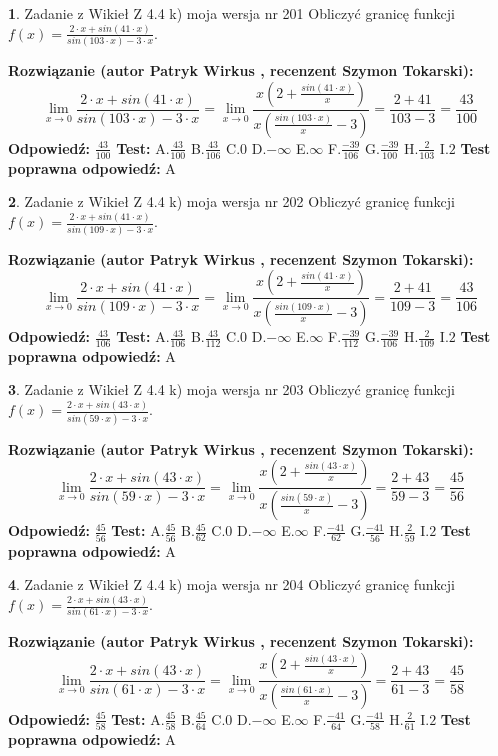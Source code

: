\documentclass[12pt, a4paper]{article}
\theoremstyle{definition} %
\newtheorem{zad}{}
\newcommand{\zadStart}[1]{\begin{zad}#1\newline}
\newcommand{\zadStop}{\end{zad}}
\newcommand{\rozwStart}[2]{\noindent \textbf{Rozwiązanie (autor #1 , recenzent #2): }\newline}
\newcommand{\rozwStop}{\newline}
\newcommand{\odpStart}{\noindent \textbf{Odpowiedź:}\newline}
\newcommand{\odpStop}{\newline}
\newcommand{\testStart}{\noindent \textbf{Test:}\newline}
\newcommand{\testStop}{\newline}
\newcommand{\kluczStart}{\noindent \textbf{Test poprawna odpowiedź:}\newline}
\newcommand{\kluczStop}{\newline}
\begin{document}
\zadStart{Zadanie z Wikieł Z 4.4 k) moja wersja nr 201}
Obliczyć granicę funkcji $f(x)=\frac{2\cdot x +sin(41\cdot x)}{sin(103\cdot x) -3\cdot x}$.
\zadStop
\rozwStart{Patryk Wirkus}{Szymon Tokarski}
$$\lim\limits_{x\to 0}\frac{2\cdot x +sin(41\cdot x)}{sin(103\cdot x) -3\cdot x}
=\lim\limits_{x\to 0}\frac{x(2+\frac{sin(41\cdot x)}{x})}{x(\frac{sin(103\cdot x)}{x}-3)}
=\frac{2+41}{103-3} = \frac{43}{100}$$
\rozwStop
\odpStart
$\frac{43}{100}$
\odpStop
\testStart
A.$\frac{43}{100}$
B.$\frac{43}{106}$
C.$0$
D.$-\infty$
E.$\infty$
F.$\frac{-39}{106}$
G.$\frac{-39}{100}$
H.$\frac{2}{103}$
I.$2$
\testStop
\kluczStart
A
\kluczStop



\zadStart{Zadanie z Wikieł Z 4.4 k) moja wersja nr 202}
Obliczyć granicę funkcji $f(x)=\frac{2\cdot x +sin(41\cdot x)}{sin(109\cdot x) -3\cdot x}$.
\zadStop
\rozwStart{Patryk Wirkus}{Szymon Tokarski}
$$\lim\limits_{x\to 0}\frac{2\cdot x +sin(41\cdot x)}{sin(109\cdot x) -3\cdot x}
=\lim\limits_{x\to 0}\frac{x(2+\frac{sin(41\cdot x)}{x})}{x(\frac{sin(109\cdot x)}{x}-3)}
=\frac{2+41}{109-3} = \frac{43}{106}$$
\rozwStop
\odpStart
$\frac{43}{106}$
\odpStop
\testStart
A.$\frac{43}{106}$
B.$\frac{43}{112}$
C.$0$
D.$-\infty$
E.$\infty$
F.$\frac{-39}{112}$
G.$\frac{-39}{106}$
H.$\frac{2}{109}$
I.$2$
\testStop
\kluczStart
A
\kluczStop



\zadStart{Zadanie z Wikieł Z 4.4 k) moja wersja nr 203}
Obliczyć granicę funkcji $f(x)=\frac{2\cdot x +sin(43\cdot x)}{sin(59\cdot x) -3\cdot x}$.
\zadStop
\rozwStart{Patryk Wirkus}{Szymon Tokarski}
$$\lim\limits_{x\to 0}\frac{2\cdot x +sin(43\cdot x)}{sin(59\cdot x) -3\cdot x}
=\lim\limits_{x\to 0}\frac{x(2+\frac{sin(43\cdot x)}{x})}{x(\frac{sin(59\cdot x)}{x}-3)}
=\frac{2+43}{59-3} = \frac{45}{56}$$
\rozwStop
\odpStart
$\frac{45}{56}$
\odpStop
\testStart
A.$\frac{45}{56}$
B.$\frac{45}{62}$
C.$0$
D.$-\infty$
E.$\infty$
F.$\frac{-41}{62}$
G.$\frac{-41}{56}$
H.$\frac{2}{59}$
I.$2$
\testStop
\kluczStart
A
\kluczStop



\zadStart{Zadanie z Wikieł Z 4.4 k) moja wersja nr 204}
Obliczyć granicę funkcji $f(x)=\frac{2\cdot x +sin(43\cdot x)}{sin(61\cdot x) -3\cdot x}$.
\zadStop
\rozwStart{Patryk Wirkus}{Szymon Tokarski}
$$\lim\limits_{x\to 0}\frac{2\cdot x +sin(43\cdot x)}{sin(61\cdot x) -3\cdot x}
=\lim\limits_{x\to 0}\frac{x(2+\frac{sin(43\cdot x)}{x})}{x(\frac{sin(61\cdot x)}{x}-3)}
=\frac{2+43}{61-3} = \frac{45}{58}$$
\rozwStop
\odpStart
$\frac{45}{58}$
\odpStop
\testStart
A.$\frac{45}{58}$
B.$\frac{45}{64}$
C.$0$
D.$-\infty$
E.$\infty$
F.$\frac{-41}{64}$
G.$\frac{-41}{58}$
H.$\frac{2}{61}$
I.$2$
\testStop
\kluczStart
A
\kluczStop
\end{document}
